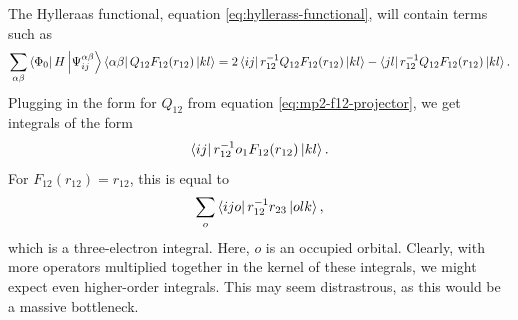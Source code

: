 The Hylleraas functional, equation \ref{eq:hyllerass-functional}, will contain terms such as
\begin{equation}
    \sum_{\alpha\beta}\bra{\Phi_0}H\ket{\Psi_{ij}^{\alpha\beta}} \bra{\alpha\beta}Q_{12}F_{12}(r_{12})\ket{kl} = 2\bra{ij}r_{12}^{-1}Q_{12}F_{12}(r_{12})\ket{kl} - \bra{jl}r_{12}^{-1}Q_{12}F_{12}(r_{12})\ket{kl}.
\end{equation}
Plugging in the form for $Q_{12}$ from equation \ref{eq:mp2-f12-projector}, we get integrals of the form
\begin{equation}
    \bra{ij}r_{12}^{-1}o_1F_{12}(r_{12})\ket{kl}.
\end{equation}
For $F_{12}(r_{12})=r_{12}$, this is equal to
\begin{equation}
    \sum_o\bra{ijo}r_{12}^{-1}r_{23}\ket{olk},
\end{equation}
which is a three-electron integral. Here, $o$ is an occupied orbital. Clearly, with more operators multiplied together in the kernel of these integrals, we might expect even higher-order integrals. This may seem distrastrous, as this would be a massive bottleneck.

